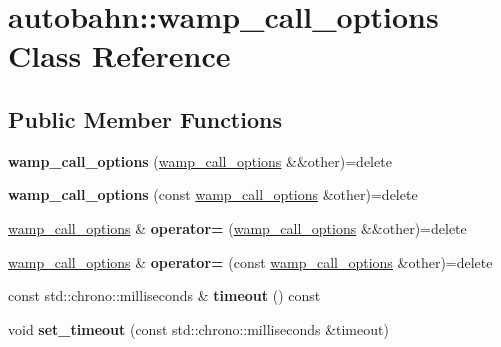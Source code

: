 \hypertarget{classautobahn_1_1wamp__call__options}{}\section{autobahn\+:\+:wamp\+\_\+call\+\_\+options Class Reference}
\label{classautobahn_1_1wamp__call__options}
\subsection*{Public Member Functions}
\begin{DoxyCompactItemize}
\item 
{\bfseries wamp\+\_\+call\+\_\+options} (\hyperlink{classautobahn_1_1wamp__call__options}{wamp\+\_\+call\+\_\+options} \&\&other)=delete\hypertarget{classautobahn_1_1wamp__call__options_a7320f5097f472fac99dcc0e6cdd6b244}{}\label{classautobahn_1_1wamp__call__options_a7320f5097f472fac99dcc0e6cdd6b244}

\item 
{\bfseries wamp\+\_\+call\+\_\+options} (const \hyperlink{classautobahn_1_1wamp__call__options}{wamp\+\_\+call\+\_\+options} \&other)=delete\hypertarget{classautobahn_1_1wamp__call__options_afffb86d4d60a63e73ffe1d4d24b5e14c}{}\label{classautobahn_1_1wamp__call__options_afffb86d4d60a63e73ffe1d4d24b5e14c}

\item 
\hyperlink{classautobahn_1_1wamp__call__options}{wamp\+\_\+call\+\_\+options} \& {\bfseries operator=} (\hyperlink{classautobahn_1_1wamp__call__options}{wamp\+\_\+call\+\_\+options} \&\&other)=delete\hypertarget{classautobahn_1_1wamp__call__options_a435b21f81e2056df9a59fa87a3b766eb}{}\label{classautobahn_1_1wamp__call__options_a435b21f81e2056df9a59fa87a3b766eb}

\item 
\hyperlink{classautobahn_1_1wamp__call__options}{wamp\+\_\+call\+\_\+options} \& {\bfseries operator=} (const \hyperlink{classautobahn_1_1wamp__call__options}{wamp\+\_\+call\+\_\+options} \&other)=delete\hypertarget{classautobahn_1_1wamp__call__options_aa7bde6f3533cefa13352c7687ade22cb}{}\label{classautobahn_1_1wamp__call__options_aa7bde6f3533cefa13352c7687ade22cb}

\item 
const std\+::chrono\+::milliseconds \& {\bfseries timeout} () const \hypertarget{classautobahn_1_1wamp__call__options_a8e68accff70a895c4aef95d04ea4d5a2}{}\label{classautobahn_1_1wamp__call__options_a8e68accff70a895c4aef95d04ea4d5a2}

\item 
void {\bfseries set\+\_\+timeout} (const std\+::chrono\+::milliseconds \&timeout)\hypertarget{classautobahn_1_1wamp__call__options_a30ac78e9ae0f3f2de813971fc3ad712c}{}\label{classautobahn_1_1wamp__call__options_a30ac78e9ae0f3f2de813971fc3ad712c}

\end{DoxyCompactItemize}


